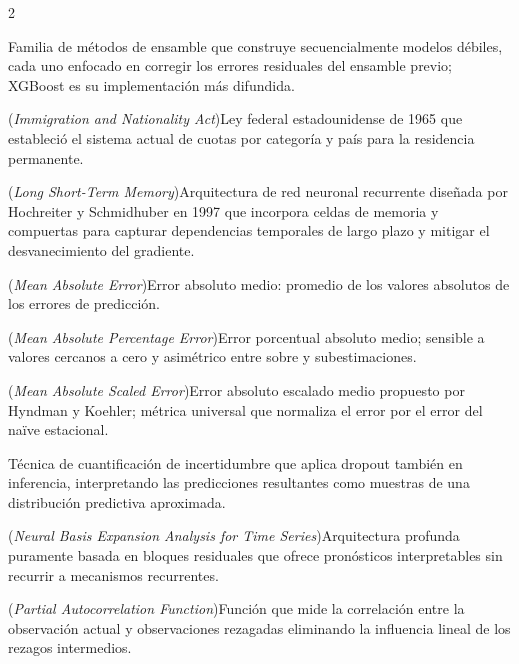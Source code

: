 \documentclass[12pt,letterpaper]{report}
\begin{document}
\begin{multicols}{2}
\begin{description}[leftmargin=0pt, labelindent=0pt, itemindent=0pt,
                    labelsep=0.4em, font=\bfseries\scriptsize,
                    itemsep=2pt, parsep=0pt, topsep=0pt]
    \item[Gradient Boosting] Familia de métodos de ensamble que construye secuencialmente modelos débiles, cada uno enfocado en corregir los errores residuales del ensamble previo; XGBoost es su implementación más difundida.

    \item[INA] (\textit{Immigration and Nationality Act})\hspace{0.3em}Ley federal estadounidense de 1965 que estableció el sistema actual de cuotas por categoría y país para la residencia permanente.

    \item[LSTM] (\textit{Long Short-Term Memory})\hspace{0.3em}Arquitectura de red neuronal recurrente diseñada por Hochreiter y Schmidhuber en 1997 que incorpora celdas de memoria y compuertas para capturar dependencias temporales de largo plazo y mitigar el desvanecimiento del gradiente.

    \item[MAE] (\textit{Mean Absolute Error})\hspace{0.3em}Error absoluto medio: promedio de los valores absolutos de los errores de predicción.

    \item[MAPE] (\textit{Mean Absolute Percentage Error})\hspace{0.3em}Error porcentual absoluto medio; sensible a valores cercanos a cero y asimétrico entre sobre y subestimaciones.

    \item[MASE] (\textit{Mean Absolute Scaled Error})\hspace{0.3em}Error absoluto escalado medio propuesto por Hyndman y Koehler; métrica universal que normaliza el error por el error del naïve estacional.

    \item[Monte Carlo Dropout] Técnica de cuantificación de incertidumbre que aplica dropout también en inferencia, interpretando las predicciones resultantes como muestras de una distribución predictiva aproximada.

    \item[N-BEATS] (\textit{Neural Basis Expansion Analysis for Time Series})\hspace{0.3em}Arquitectura profunda puramente basada en bloques residuales que ofrece pronósticos interpretables sin recurrir a mecanismos recurrentes.

    \item[PACF] (\textit{Partial Autocorrelation Function})\hspace{0.3em}Función que mide la correlación entre la observación actual y observaciones rezagadas eliminando la influencia lineal de los rezagos intermedios.


\end{description}
\end{multicols}
\end{document}
